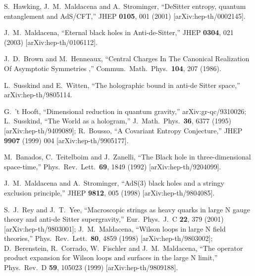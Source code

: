 \documentclass[twocolumn,amsmath,amssymb,nofootinbib,eqsecnum,tighten,prd]{revtex4}
\begin{document}
\begin{thebibliography}{99}

 S.~Hawking, J.~M.~Maldacena and A.~Strominger,
  ``DeSitter entropy, quantum entanglement and AdS/CFT,''
  JHEP {\bf 0105}, 001 (2001)
  [arXiv:hep-th/0002145].

J.~M.~Maldacena,
  ``Eternal black holes in Anti-de-Sitter,''
JHEP {\bf 0304}, 021 (2003)
  [arXiv:hep-th/0106112].

  J.~D.~Brown and M.~Henneaux,
  ``Central Charges In The Canonical Realization Of Asymptotic Symmetries
  ,''
  Commun.\ Math.\ Phys.\  {\bf 104}, 207 (1986).


L.~Susskind and E.~Witten,
  ``The holographic bound in anti-de Sitter space,''
  arXiv:hep-th/9805114.

G.~'t Hooft,
  ``Dimensional reduction in quantum gravity,''
  arXiv:gr-qc/9310026;
L.~Susskind,
  ``The World as a hologram,''
  J.\ Math.\ Phys.\  {\bf 36}, 6377 (1995)
  [arXiv:hep-th/9409089];
R.~Bousso,
  ``A Covariant Entropy Conjecture,''
  JHEP {\bf 9907} (1999) 004
  [arXiv:hep-th/9905177].



 M.~Banados, C.~Teitelboim and J.~Zanelli,
  ``The Black hole in three-dimensional space-time,''
  Phys.\ Rev.\ Lett.\  {\bf 69}, 1849 (1992)
  [arXiv:hep-th/9204099].


J.~M.~Maldacena and A.~Strominger,
``AdS(3) black holes and a stringy exclusion principle,''
JHEP {\bf 9812}, 005 (1998)
 [arXiv:hep-th/9804085].


S.~J.~Rey and J.~T.~Yee,
  ``Macroscopic strings as heavy quarks in large N gauge theory and  anti-de
  Sitter supergravity,''
  Eur.\ Phys.\ J.\ C {\bf 22}, 379 (2001)
  [arXiv:hep-th/9803001];
J.~M.~Maldacena,
  ``Wilson loops in large N field theories,''
  Phys.\ Rev.\ Lett.\  {\bf 80}, 4859 (1998)
  [arXiv:hep-th/9803002];
 D.~Berenstein, R.~Corrado, W.~Fischler and J.~M.~Maldacena,
  ``The operator product expansion for Wilson loops and surfaces in the  large
  N limit,''
  Phys.\ Rev.\ D {\bf 59}, 105023 (1999)  [arXiv:hep-th/9809188].





\end{thebibliography}
\end{document}

